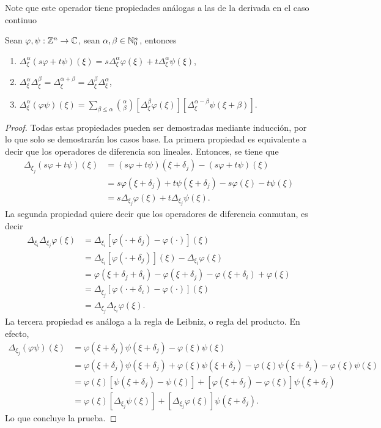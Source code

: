 Note que este operador tiene propiedades análogas a las de la derivada en el caso continuo
\begin{proposition}
	Sean $\varphi, \psi:\mathbb{Z}^n\to\mathbb{C}$, sean $\alpha, \beta\in\mathbb{N}^n_0$, entonces
	\begin{enumerate}
		\item $\Delta^\alpha_\xi(s\varphi+t\psi)(\xi) = s\Delta^\alpha_\xi\varphi(\xi) + t\Delta^\alpha_\xi\psi(\xi)$,
		\item $\Delta^\alpha_\xi\Delta^\beta_\xi = \Delta^{\alpha+\beta}_\xi = \Delta^\beta_\xi\Delta^\alpha_\xi$, 
		\item $\Delta^\alpha_\xi(\varphi\psi)(\xi) = \sum_{\beta\leq\alpha}\binom{\alpha}{\beta}[\Delta^\beta_\xi\varphi(\xi)][\Delta^{\alpha-\beta}_\xi\psi(\xi+\beta)]$.
	\end{enumerate}
\end{proposition}
\begin{proof}
	Todas estas propiedades pueden ser demostradas mediante inducción, por lo que solo se demostrarán los casos base. La primera propiedad es equivalente a decir que los operadores de diferencia son lineales. Entonces, se tiene que 
	\begin{align*}
		\Delta_{\xi_j}(s\varphi+t\psi)(\xi) & = (s\varphi+t\psi)(\xi+\delta_j) - (s\varphi+t\psi)(\xi) \\
		& = s\varphi(\xi+\delta_j) + t\psi(\xi+\delta_j) - s\varphi(\xi)- t\psi(\xi) \\
		& = s\Delta_{\xi_j}\varphi(\xi) + t\Delta_{\xi_j}\psi(\xi).
	\end{align*}
	La segunda propiedad quiere decir que los operadores de diferencia conmutan, es decir
	\begin{align*}
		\Delta_{\xi_i}\Delta_{\xi_j}\varphi(\xi) &= \Delta_{\xi_i}[\varphi(\cdot +\delta_j) - \varphi(\cdot)](\xi) \\
		& =  \Delta_{\xi_i}[\varphi(\cdot+\delta_j)] (\xi)- \Delta_{\xi_i}\varphi(\xi) \\
		& = \varphi(\xi+\delta_j+\delta_i) - \varphi(\xi+\delta_j) - \varphi(\xi+\delta_i) + \varphi(\xi)\\
		& = \Delta_{\xi_j}[\varphi(\cdot+\delta_i)-\varphi(\cdot)](\xi) \\
		& = \Delta_{\xi_j}\Delta_{\xi_i}\varphi(\xi).
	\end{align*}
	La tercera propiedad es análoga a la regla de Leibniz, o regla del producto. En efecto, 
	\begin{align*}
		\Delta_{\xi_j}(\varphi\psi)(\xi) & = \varphi(\xi+\delta_j)\psi(\xi+\delta_j) - \varphi(\xi)\psi(\xi) \\
		& = \varphi(\xi+\delta_j)\psi(\xi+\delta_j) + \varphi(\xi)\psi(\xi+\delta_j) - \varphi(\xi)\psi(\xi+\delta_j) - \varphi(\xi)\psi(\xi)\\
		& = \varphi(\xi)[\psi(\xi+\delta_j) - \psi(\xi)] + [\varphi(\xi+\delta_j)-\varphi(\xi)]\psi(\xi+\delta_j)\\ 
		& = \varphi(\xi)[\Delta_{\xi_j}\psi(\xi)] + [\Delta_{\xi_j}\varphi(\xi)]\psi(\xi+\delta_j).
	\end{align*}
	Lo que concluye la prueba.
\end{proof}
